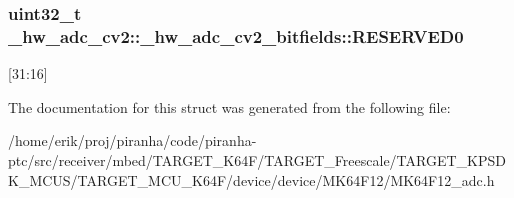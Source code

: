 \subsubsection[{\texorpdfstring{R\+E\+S\+E\+R\+V\+E\+D0}{RESERVED0}}]{\setlength{\rightskip}{0pt plus 5cm}uint32\+\_\+t \+\_\+hw\+\_\+adc\+\_\+cv2\+::\+\_\+hw\+\_\+adc\+\_\+cv2\+\_\+bitfields\+::\+R\+E\+S\+E\+R\+V\+E\+D0}\hypertarget{struct__hw__adc__cv2_1_1__hw__adc__cv2__bitfields_a3a109abaf02b9cd536b5e57be772825b}{}\label{struct__hw__adc__cv2_1_1__hw__adc__cv2__bitfields_a3a109abaf02b9cd536b5e57be772825b}
\mbox{[}31\+:16\mbox{]} 

The documentation for this struct was generated from the following file\+:\begin{DoxyCompactItemize}
\item 
/home/erik/proj/piranha/code/piranha-\/ptc/src/receiver/mbed/\+T\+A\+R\+G\+E\+T\+\_\+\+K64\+F/\+T\+A\+R\+G\+E\+T\+\_\+\+Freescale/\+T\+A\+R\+G\+E\+T\+\_\+\+K\+P\+S\+D\+K\+\_\+\+M\+C\+U\+S/\+T\+A\+R\+G\+E\+T\+\_\+\+M\+C\+U\+\_\+\+K64\+F/device/device/\+M\+K64\+F12/M\+K64\+F12\+\_\+adc.\+h\end{DoxyCompactItemize}
